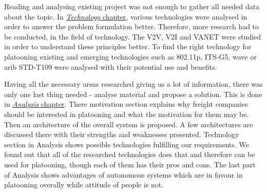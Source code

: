 %
Reading and analysing existing project was not enough to gather all needed data about the topic. In \hyperref[sec:technology]{\textit{Technology} chapter}, various technologies were analysed in order to answer the problem formulation better. Therefore, more research had to be conducted, in the field of technology. The \acrshort{V2V}, \acrshort{V2I} and \acrshort{VANET} were studied in order to understand these principles better. To find the right technology for platooning existing and emerging technologies such as 802.11p, ITS-G5, \acrshort{wave} or \acrshort{arib} STD-T109 were analysed with their potential use and benefits. \par
%
Having all the necessary areas researched giving us a lot of information, there was only one last thing needed - analyse material and propose a solution. This is done in \hyperref[sec:analysis]{\textit{Analysis} chapter}. There motivation section explains why freight companies should be interested in platooning and what the motivation for them may be. Then an architecture of the overall system is proposed. A few architectures are discussed there with their strengths and weaknesses presented. Technology section in Analysis shows possible technologies fulfilling our requirements. We found out that all of the researched technologies does that and therefore can be used for platooning, though each of them has their pros and cons. The last part of Analysis shows advantages of autonomous systems which are in favour in platooning overally while attitude of people is not. \par
%